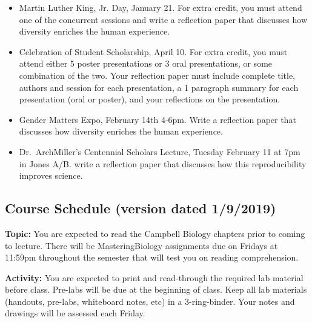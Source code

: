 \documentclass{tufte-handout}
\begin{document}
\begin{fullwidth}
\begin{itemize}
\item Martin Luther King, Jr. Day, January 21. For extra credit, you must attend one of the concurrent sessions and write a reflection paper that discusses how diversity enriches the human experience. 
\item Celebration of Student Scholarship, April 10.  For extra credit, you must attend either 5 poster presentations or 3 oral presentations, or some combination of the two.  Your reflection paper must include complete title, authors and session for each presentation, a 1 paragraph summary for each presentation (oral or poster), and your reflections on the presentation.  	
\item Gender Matters Expo, February 14th 4-6pm. Write a reflection paper that discusses how diversity enriches the human experience.
\item Dr.\ ArchMiller's Centennial Scholars Lecture, Tuesday February 11 at 7pm in Jones A/B. write a reflection paper that discusses how this reproducibility improves science.
\end{itemize}









\newpage
\subsection{Course Schedule (version dated 1/9/2019)}
%

\textbf{Topic:} You are expected to read the Campbell Biology chapters prior to coming to lecture.  There will be MasteringBiology assignments due on Fridays at 11:59pm throughout the semester that will test you on reading comprehension. 

\textbf{Activity:} You are expected to print and read-through the required lab material before class. Pre-labs will be due at the beginning of class. Keep all lab materials (handouts, pre-labs, whiteboard notes, etc) in a 3-ring-binder. Your notes and drawings will be assessed each Friday.


\end{fullwidth}
\end{document}

